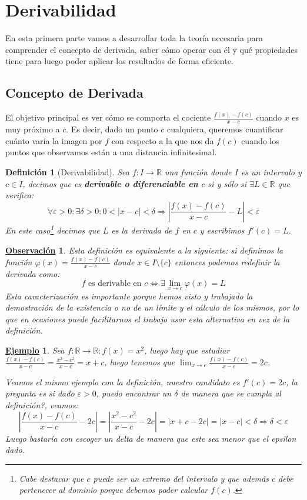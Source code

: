 \documentclass[10pt,a4paper,openright]{book}
\theoremstyle{break}
\newtheorem{defi}{Definición}[chapter]
\newtheorem{obs}{\underline{Observación}}[chapter]
\newtheorem{ej}{\underline{Ejemplo}}[chapter]
\begin{document}
\section{Derivabilidad}
En esta primera parte vamos a desarrollar toda la teoría necesaria para comprender el concepto de derivada, saber cómo operar con él y qué propiedades tiene para luego poder aplicar los resultados de forma eficiente.

\subsection{Concepto de Derivada}
El objetivo principal es ver cómo se comporta el cociente $\frac{f(x) - f(c)}{x-c}$ cuando $x$ es muy próximo a $c$. Es decir, dado un punto $c$ cualquiera, queremos cuantificar cuánto varía la imagen por $f$ con respecto a la que nos da $f(c)$ cuando los puntos que observamos están a una distancia infinitesimal.

\begin{defi}[Derivabilidad]
Sea $f: I\rightarrow \mathbb R$ una función donde $I$ es un intervalo y $c\in I$, decimos que es \textbf{derivable o diferenciable en $c$} si y sólo si $\exists L\in \mathbb R$ que verifica:
$$\forall \varepsilon>0: \exists \delta>0 : 0<|x-c|<\delta\Rightarrow \left|\frac{f(x)-f(c)}{x-c}-L\right|<\varepsilon$$
En este caso\footnote{Cabe destacar que $c$ puede ser un extremo del intervalo y que además $c$ debe pertenecer al dominio porque debemos poder calcular $f(c)$.} decimos que $L$ es la derivada de $f$ en $c$ y escribimos $f'(c)=L$.
\end{defi}

\begin{obs}
Esta definición es equivalente a la siguiente: si definimos la función $\varphi(x) = \frac{f(x)-f(c)}{x-c}$ donde $x\in I\mbox{\textbackslash}\{c\}$ entonces podemos redefinir la derivada como:
$$f\mbox{ es derivable en }c\Leftrightarrow \exists \lim_{x\rightarrow c}\varphi(x) = L$$
Esta caracterización es importante porque hemos visto y trabajado la demostración de la existencia o no de un límite y el cálculo de los mismos, por lo que en ocasiones puede facilitarnos el trabajo usar esta alternativa en vez de la definición.
\end{obs}

\begin{ej}
Sea $f: \mathbb R \rightarrow \mathbb R: f(x)=x^2$, luego hay que estudiar $\frac{f(x)-f(c)}{x-c} = \frac{x^2- c^2}{x-c}= x+c$, luego tenemos que $\lim_{x\rightarrow c} \frac{f(x)-f(c)}{x-c}= 2c$.\par
Veamos el mismo ejemplo con la definición, nuestro candidato es $f'(c)=2c$, la pregunta es si dado $\varepsilon>0$, puedo encontrar un $\delta$ de manera que se cumpla al definición?, veamos:
$$\left|\frac{f(x)-f(c)}{x-c}-2c\right| = \left|\frac{x^2-c^2}{x-c}-2c\right| = |x+c-2c|= |x-c|<\delta \Rightarrow \delta <\varepsilon$$
Luego bastaría con escoger un delta de manera que este sea menor que el epsilon dado.
\end{ej}
\end{document}
